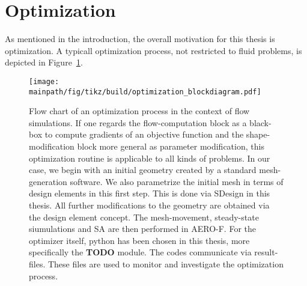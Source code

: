 \documentclass[../main.tex]{subfiles}
\begin{document}
\setlength{\delimitershortfall}{0pt}
\section{Optimization}\label{sec:optimization}


As mentioned in the introduction, the overall motivation for this thesis is optimization. A typicall optimization process, not restricted to fluid problems, is depicted in Figure~\ref{fig:optimization_blockdiagram}.
\begin{figure}[h!]
	\begin{center}
        \texttt{[image: \\mainpath/fig/tikz/build/optimization\_blockdiagram.pdf]}
        \caption[Optimization block-diagram]{Flow chart of an optimization process in the context of flow simulations. If one regards the flow-computation block as a black-box to compute gradients of an objective function and the shape-modification block more general as parameter modification, this optimization routine is applicable to all kinds of problems. In our case, we begin with an initial geometry created by a standard mesh-generation software. We also parametrize the initial mesh in terms of design elements in this first step. This is done via SDesign\cite{SDesign} in this thesis. All further modifications to the geometry are obtained via the design element concept. The mesh-movement, steady-state siumulations and \acf{SA} are then performed in AERO-F\citep{Aerof}. For the optimizer itself, python has been chosen in this thesis, more specifically the \textbf{TODO} module. The codes communicate via result-files. These files are used to monitor and investigate the optimization process.}
		\label{fig:optimization_blockdiagram}
    \end{center}
\end{figure}

\end{document}
